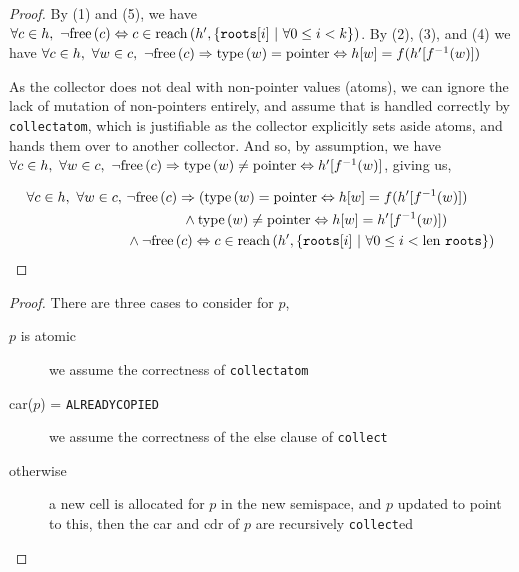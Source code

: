 \begin{proof}
  By (1) and (5), we have $\forall c \in h,\ \lnot\mathrm{free}\left(c\right) \Leftrightarrow c \in
  \mathrm{reach}\left(h', \{\mathtt{roots}[i]~|~\forall 0 \leq i < k\}\right)$. By (2),
  (3), and (4) we have $\forall c \in h,\ \forall w \in c,\ \lnot\mathrm{free}\left(c\right)
  \Rightarrow \mathrm{type}\left(w\right) = \mathrm{pointer} \Leftrightarrow h[w] =
  f(h'[f^{-1}(w)])$

  As the collector does not deal with non-pointer values (atoms), we
  can ignore the lack of mutation of non-pointers entirely, and assume
  that is handled correctly by \texttt{collectatom}, which is
  justifiable as the collector explicitly sets aside atoms, and hands
  them over to another collector. And so, by assumption, we have
  $\forall c \in h,\ \forall w \in c,\ \lnot\mathrm{free}\left(c\right) \Rightarrow
  \mathrm{type}\left(w\right) \neq \mathrm{pointer} \Leftrightarrow h'[f^{-1}(w)]$, giving
  us,

  \begin{align*}
    \forall c \in h,\ \forall w \in c,\ &\lnot\mathrm{free}\left(c\right) \Rightarrow
    (\mathrm{type}\left(w\right) = \mathrm{pointer} \Leftrightarrow h[w] = f(h'[f^{-1}(w)])\\
    &\quad\quad\quad\quad \land \mathrm{type}\left(w\right) \neq \mathrm{pointer}
    \Leftrightarrow h[w] = h'[f^{-1}(w)])\\
    &\land \lnot\mathrm{free}\left(c\right) \Leftrightarrow c \in \mathrm{reach}\left(h', \{\mathtt{roots}[i]~|~\forall
      0 \leq i < \mathrm{len}~\mathtt{roots}\}\right)
  \end{align*}
\end{proof}

\begin{lemma}
  \label{lem:c-example-reach}
\end{lemma}

\begin{proof}
  There are three cases to consider for $p$,

  \begin{description}
  \item[$p$ is atomic] we assume the correctness of
    \texttt{collectatom}

  \item[car($p$) = \texttt{ALREADYCOPIED}] we assume the correctness
    of the else clause of \texttt{collect}

  \item[otherwise] a new cell is allocated for $p$ in the new
    semispace, and $p$ updated to point to this, then the car and cdr
    of $p$ are recursively \texttt{collect}ed
  \end{description}
\end{proof}

